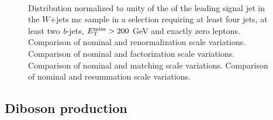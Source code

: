\begin{figure}[h!]
\centering 
{}
\\
\caption{Distribution normalized to unity of the \pt of the leading signal jet in the $W$+jets \gls{mc} sample in a selection requiring at least four jets, at least two \textit{b}-jets, $E_{\rm T}^{\mathrm{miss}}>200$ GeV and exactly zero leptons. 
 Comparison of nominal and renormalization scale variations.
 Comparison of nominal and factorization scale variations.
 Comparison of nominal and matching scale variations.
 Comparison of nominal and resummation scale variations.
}\label{fig:W_met_0L_syst}
\end{figure}


\subsection{Diboson production}

